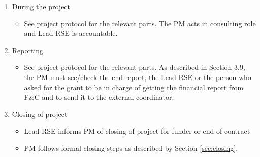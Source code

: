 \begin{enumerate}[label=\arabic*.,ref=\arabic*]
\item During the project
\begin{itemize}
\item See project protocol for the relevant parts. The PM acts in consulting role and Lead RSE is
accountable.
\end{itemize}
\item Reporting
\begin{itemize}
\item See project protocol for the relevant parts. As described in Section 3.9, the PM must
see/check the end report, the Lead RSE or the person who asked for the grant to be in charge of getting the financial
report from F\&C and to send it to the external coordinator.
\end{itemize}
\item Closing of project
\begin{itemize}
\item Lead RSE informs PM of closing of project for funder or end of contract
\item PM follows formal closing steps as described by Section \ref{sec:closing}.
\end{itemize}
\end{enumerate}




